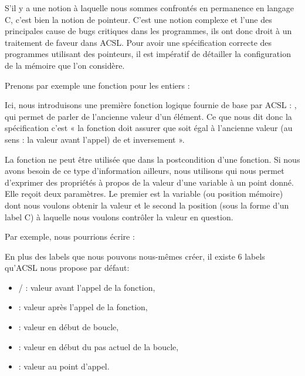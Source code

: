 S'il y a une notion à laquelle nous sommes confrontés en permanence en
langage C, c'est bien la notion de pointeur. C'est une notion complexe et
l'une des principales cause de bugs critiques dans les programmes, ils ont
donc droit à un traitement de faveur dans ACSL. Pour avoir une spécification
correcte des programmes utilisant des pointeurs, il est impératif de détailler
la configuration de la mémoire que l'on considère.



Prenons par exemple une fonction  pour les entiers :








Ici, nous introduisons une première fonction logique fournie de base par
ACSL : , qui permet de parler de l'ancienne valeur d'un élément.
Ce que nous dit donc la spécification c'est « la fonction doit assurer que
 soit égal à l'ancienne valeur (au sens : la valeur avant l'appel) de 
et inversement ».



La fonction  ne peut être utilisée que dans la postcondition d'une
fonction. Si nous avons besoin de ce type d'information ailleurs, nous
utilisons  qui nous permet d'exprimer des propriétés à propos de la
valeur d'une variable à un point donné. Elle reçoit deux paramètres. Le premier
est la variable (ou position mémoire) dont nous voulons obtenir la valeur et le
second la position (sous la forme d'un label C) à laquelle nous voulons
contrôler la valeur en question.



Par exemple, nous pourrions écrire :






En plus des labels que nous pouvons nous-mêmes créer, il existe 6 labels
qu'ACSL nous propose par défaut:



\begin{itemize}
\item {}/ : valeur avant l'appel de la fonction,
\item {} : valeur après l'appel de la fonction,
\item {} : valeur en début de boucle,
\item {} : valeur en début du pas actuel de la boucle,
\item {} : valeur au point d'appel.
\end{itemize}


